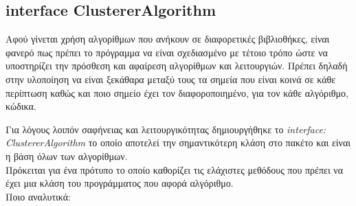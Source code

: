 \subsection{interface ClustererAlgorithm}
\noindent
Αφού γίνεται χρήση αλγορίθμων που ανήκουν σε διαφορετικές βιβλιοθήκες, είναι φανερό πως πρέπει το πρόγραμμα να είναι σχεδιασμένο με τέτοιο τρόπο 
ώστε να υποστηρίζει την πρόσθεση και αφαίρεση αλγορίθμων και λειτουργιών. Πρέπει δηλαδή στην υλοποίηση να είναι ξεκάθαρα μεταξύ τους τα σημεία που είναι κοινά σε 
κάθε περίπτωση καθώς και ποιο σημείο έχει τον διαφοροποιημένο, για τον κάθε αλγόριθμο, κώδικα. 

Για λόγους λοιπόν σαφήνειας και λειτουργικότητας δημιουργήθηκε το   \emph{interface: ClustererAlgorithm}  το οποίο αποτελεί την σημαντικότερη κλάση στο πακέτο και 
είναι η βάση όλων των αλγορίθμων.\\
Πρόκειται για ένα πρότυπο το οποίο καθορίζει τις ελάχιστες μεθόδους που πρέπει να έχει μια κλάση του προγράμματος που αφορά αλγόριθμο.\\
Ποιο αναλυτικά:

